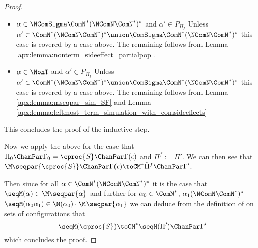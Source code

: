 \begin{proof}
\begin{itemize}
\begin{itemize}
			\begin{itemize}
				\item $\alpha' \in \ComN^*(\NComN\ComN^*)^*$ \newline
				So it must be the case that
				$\alpha = X\alpha_0\alpha_1$, $X \in \NComN$, $\alpha_0 \in \ComN^*$ $\alpha_1 \in (\NComN\ComN^*)^*$ and $\alpha' = \alpha'_0\alpha'_1\alpha_1$ where 
				$\alpha'_1 \in (\NComN\ComN^*)^*$, $\alpha'_0 \in \ComN^*$
				Lemma \ref{apx:lemma:sim_fromcom_pop_or_nonterm}.2 applies to give
				$$\M\seqpar{\cproc{X\alpha_0\alpha_1} \parallel \Pi_k} \ChanPar \Gamma_k \toCM^* \cproc{\M(\alpha'_0) \cdot \M\seqpar{\alpha'_1\alpha_1}}\parallel \M\seqpar{\Pi_k} \parallel \M\seqpar{\Pi(w)} \ChanPar \Gamma_k \oplus \Gamma(w)$$

				\item $\alpha' \in \ComSigma\ComN^*(\NComN\ComN^*)^*$\newline
				Follows from Lemma \ref{apx:lemma:leftmost_term_simulation_with_comsideeffects}
			\end{itemize}
		\item $\alpha \in \NComSigma\ComN^*(\NComN\ComN^*)^*$ and $\alpha' \in P_{\Pi_f}$\newline
			Unless $\alpha' \in \ComN^*(\NComN\ComN^*)^* \union \ComSigma\ComN^*(\NComN\ComN^*)^*$ this case is covered by a case above.
			The remaining follows from Lemma \ref{apx:lemma:nonterm_sideeffect_partialpop}.
		\item $\alpha \in \NonT$ and $\alpha' \in P_{\Pi_f}$\newline
			Unless $\alpha' \in \ComN^*(\NComN\ComN^*)^* \union \ComSigma\ComN^*(\NComN\ComN^*)^*$ this case is covered by a case above.
			The remaining follows from Lemma \ref{apx:lemma:mseqpar_sim_SF} and Lemma \ref{apx:lemma:leftmost_term_simulation_with_comsideeffects}
	\end{itemize}
	This concludes the proof of the inductive step.
\end{itemize}
Now we apply the above for the case that
$\Pi_0 \ChanPar \Gamma_0 = \cproc{S} \ChanPar \Gamma(\epsilon)$ and $\Pi^f := \Pi'$.
We can then see that $\M\seqpar{\cproc{S}} \ChanPar \Gamma(\epsilon) \toCM^* \tilde{\Pi}^f \ChanPar \Gamma'$.

Then since for all $\alpha \in \ComN^*(\NComN\ComN^*)^*$ it is the case that 
$\seqM(\alpha) \in \M\seqpar{\alpha}$ and further for 
$\alpha_0 \in \ComN^*$, $\alpha_1 (\NComN\ComN^*)^*$
$\seqM(\alpha_0\alpha_1) \in \M(\alpha_0) \cdot \M\seqpar{\alpha_1}$ we can deduce from the definition of \toCM on sets of configurations that
$$\seqM(\cproc{S}) \toCM^* \seqM(\Pi') \ChanPar \Gamma'$$ which concludes the proof.
\end{proof}
